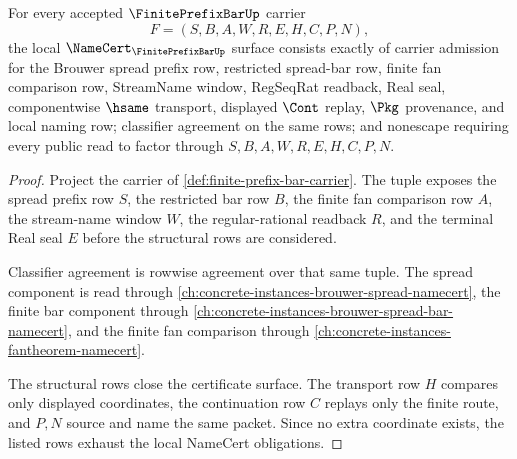 \begin{theorem}
\label{thm:finite-prefix-bar-namecert-obligations}
For every accepted $\FinitePrefixBarUp$ carrier
$$
F=(S,B,A,W,R,E,H,C,P,N),
$$
the local $\NameCert_{\FinitePrefixBarUp}$ surface consists exactly of carrier admission for the Brouwer spread prefix row, restricted spread-bar row, finite fan comparison row, StreamName window, RegSeqRat readback, Real seal, componentwise $\hsame$ transport, displayed $\Cont$ replay, $\Pkg$ provenance, and local naming row; classifier agreement on the same rows; and nonescape requiring every public read to factor through $S,B,A,W,R,E,H,C,P,N$.
\end{theorem}
\begin{proof}
Project the carrier of \autoref{def:finite-prefix-bar-carrier}. The tuple exposes the spread prefix row $S$, the restricted bar row $B$, the finite fan comparison row $A$, the stream-name window $W$, the regular-rational readback $R$, and the terminal Real seal $E$ before the structural rows are considered.

Classifier agreement is rowwise agreement over that same tuple. The spread component is read through \autoref{ch:concrete-instances-brouwer-spread-namecert}, the finite bar component through \autoref{ch:concrete-instances-brouwer-spread-bar-namecert}, and the finite fan comparison through \autoref{ch:concrete-instances-fantheorem-namecert}.

The structural rows close the certificate surface. The transport row $H$ compares only displayed coordinates, the continuation row $C$ replays only the finite route, and $P,N$ source and name the same packet. Since no extra coordinate exists, the listed rows exhaust the local NameCert obligations.
\end{proof}

